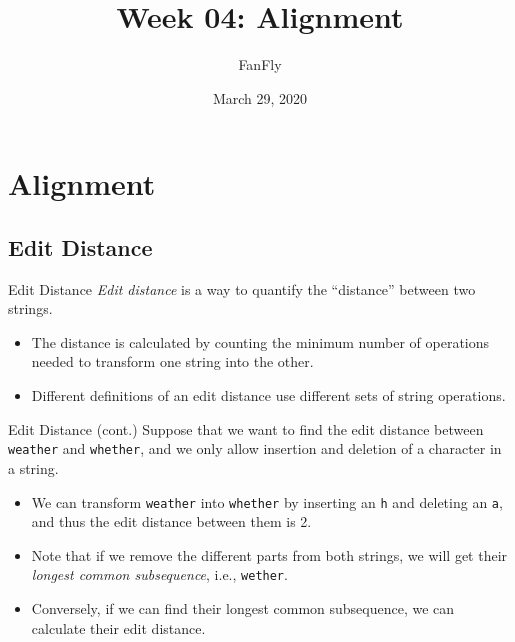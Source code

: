 \documentclass{beamer}
\title{Week 04: Alignment}
\author{FanFly}
\date{March 29, 2020}
\begin{document}
\begin{frame}
  \titlepage
\end{frame}

\section{Alignment}
\subsection{Edit Distance}
\begin{frame}[fragile]{Edit Distance}
  \emph{Edit distance} is a way to quantify the ``distance'' between two
  strings. \pause
  \begin{itemize}
    \item The distance is calculated by counting the minimum number of
    operations needed to transform one string into the other. \pause
    \item Different definitions of an edit distance use different sets of
    string operations.
  \end{itemize}
\end{frame}

\begin{frame}{Edit Distance (cont.)}
  Suppose that we want to find the edit distance between
  {\color{red}\lstinline{weather}}
  and
  {\color{blue}\lstinline{whether}},
  and we only allow insertion and deletion of a
  character in a string. \pause
  \begin{itemize}
    \item We can transform
    {\color{red}\lstinline{weather}}
    into
    {\color{blue}\lstinline{whether}}
    by inserting an
    {\color{blue}\lstinline{h}}
    and deleting an
    {\color{red}\lstinline{a}}, and thus the edit distance between them is 2.
    \pause
    \item Note that if we remove the different parts from both strings, we will
    get their \emph{longest common subsequence}, i.e., \lstinline{wether}.
    \pause
    \item Conversely, if we can find their longest common subsequence, we can
    calculate their edit distance.
  \end{itemize}
\end{frame}
\end{document}
